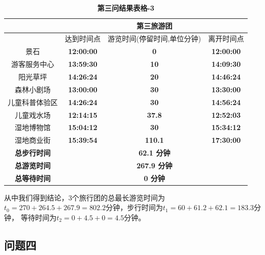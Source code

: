 \documentclass[hyperref,UTF8]{article}
\begin{document}
{\begin{table}[htbp]
  \centering
  \caption{\textbf{第三问结果表格-3}}
  \begin{tabular}{|c|c|c|c|}
    \hline
    \multicolumn{1}{|r|}{} & \multicolumn{3}{c|}{\textbf{第三旅游团}} \bigstrut\\
    \hline
    \multicolumn{1}{|r|}{} & 达到时间点 & \multicolumn{1}{p{4.055em}|}{游览时间(停留时间,单位分钟)} & \multicolumn{1}{p{4.055em}|}{离开时间点} \bigstrut\\
    \hline
    景石 & \multicolumn{1}{c|}{\textbf{12:00:00}} & \textbf{0} & \textbf{12:00:00} \bigstrut\\
    \hline
    游客服务中心 & \multicolumn{1}{c|}{\textbf{13:59:30}} & \textbf{10} & \textbf{14:09:30} \bigstrut\\
    \hline
    阳光草坪 & \multicolumn{1}{c|}{\textbf{14:26:24}} & \textbf{20} & \textbf{14:46:24} \bigstrut\\
    \hline
    森林小剧场 & \multicolumn{1}{c|}{\textbf{13:00:00}} & \textbf{30} & \textbf{13:30:00} \bigstrut\\
    \hline
    儿童科普体验区 & \multicolumn{1}{c|}{\textbf{14:26:24}} & \textbf{30} & \textbf{14:56:24} \bigstrut\\
    \hline
    儿童戏水场 & \multicolumn{1}{c|}{\textbf{12:14:15}} & \textbf{37.8} & \textbf{12:52:03} \bigstrut\\
    \hline
    湿地博物馆 & \multicolumn{1}{c|}{\textbf{15:04:12}} & \textbf{30} & \textbf{15:34:12} \bigstrut\\
    \hline
    湿地商业街 & \multicolumn{1}{c|}{\textbf{15:39:54}} & \textbf{110.1} & \textbf{17:30:00} \bigstrut\\
    \hline
    \textbf{总步行时间} & \multicolumn{3}{c|}{\textbf{62.1 分钟}} \bigstrut\\
    \hline
    \textbf{总游览时间} & \multicolumn{3}{c|}{\textbf{267.9 分钟}} \bigstrut\\
    \hline
    \textbf{总等待时间} & \multicolumn{3}{c|}{\textbf{0  分钟}} \bigstrut\\
    \hline
    \end{tabular}%
  \label{tab:addlabel-3}%
\end{table}%

从中我们得到结论，3个旅行团的总最长游览时间为$t_0=270+264.5+267.9=802.2$分钟，步行时间为$t_1=60+61.2+62.1=183.3$分钟，
等待时间为$t_2=0+4.5+0=4.5$分钟。

\subsection{问题四}
}
\end{document}
